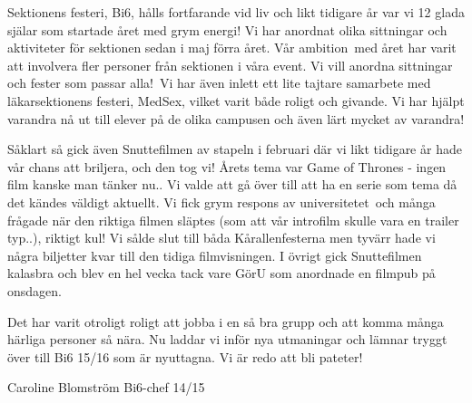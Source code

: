 
Sektionens festeri, Bi6, hålls fortfarande vid liv och likt tidigare år var vi 12 glada själar som startade året med grym energi! Vi har anordnat olika sittningar och aktiviteter för sektionen sedan i maj förra året. Vår ambition med året har varit att involvera fler personer från sektionen i våra event. Vi vill anordna sittningar och fester som passar alla! Vi har även inlett ett lite tajtare samarbete med läkarsektionens festeri, MedSex, vilket varit både roligt och givande. Vi har hjälpt varandra nå ut till elever på de olika campusen och även lärt mycket av varandra!

Såklart så gick även Snuttefilmen av stapeln i februari där vi likt tidigare år hade vår chans att briljera, och den tog vi! Årets tema var Game of Thrones - ingen film kanske man tänker nu.. Vi valde att gå över till att ha en serie som tema då det kändes väldigt aktuellt. Vi fick grym respons av universitetet och många frågade när den riktiga filmen släptes (som att vår introfilm skulle vara en trailer typ..), riktigt kul! Vi sålde slut till båda Kårallenfesterna men tyvärr hade vi några biljetter kvar till den tidiga filmvisningen. I övrigt gick Snuttefilmen kalasbra och blev en hel vecka tack vare GörU som anordnade en filmpub på onsdagen.

Det har varit otroligt roligt att jobba i en så bra grupp och att komma många härliga personer så nära. Nu laddar vi inför nya utmaningar och lämnar tryggt över till Bi6 15/16 som är nyuttagna.
Vi är redo att bli pateter!

Caroline Blomström
Bi6-chef 14/15
